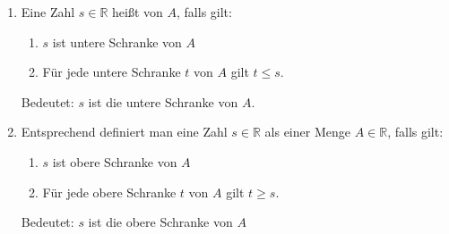 \begin{enumerate}[label=\alph*),leftmargin=*]
    \item Eine Zahl $s \in \mathbb{R}$ heißt  von $A$, falls gilt:
        \begin{enumerate}[label=\arabic*.]
            \item $s$ ist untere Schranke von $A$
            \item Für jede untere Schranke $t$ von $A$ gilt $t \leq s$.
        \end{enumerate}
        Bedeutet: $s$ ist die  untere Schranke von $A$.
    \item Entsprechend definiert man eine Zahl $s \in \mathbb{R}$ als  einer Menge $A \in \mathbb{R}$, falls gilt:
        \begin{enumerate}[label=\arabic*.]
            \item $s$ ist obere Schranke von $A$
            \item Für jede obere Schranke $t$ von $A$ gilt $t \geq s$.
        \end{enumerate}
        Bedeutet: $s$ ist die  obere Schranke von $A$
\end{enumerate}